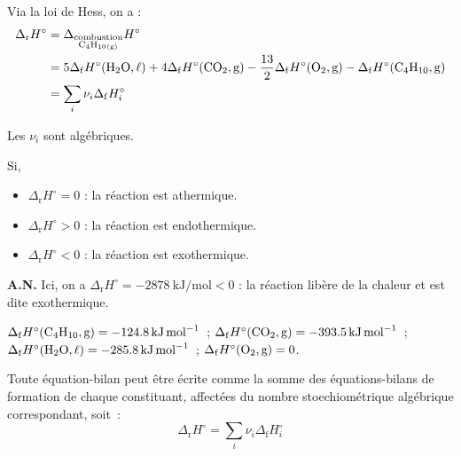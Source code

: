 \documentclass{article}
\newcommand{\Dr}{\Delta_{\mathrm{r}}}
\newcommand{\Df}{\Delta_{\mathrm{f}}}
\begin{document}
\begin{tableau}
    Via la loi de Hess, on a :
    \begin{align*}
        \Dr H^\circ &= \Delta_{\substack{\mathrm{combustion}\\\ce{C4H10_{(g)}}}} H^\circ\\
        &= 5\Df H^\circ(\ce{H2O,\ell}) + 4\Df H^\circ (\ce{CO2,g}) - \frac{13}{2} \Df H^\circ(\ce{O2,g})-\Df H^\circ (\ce{C4H10,g)}\\
        & = \sum_i \nu_i \Df H_i^\circ
    \end{align*}
    \begin{attention}
        Les $\nu_i$ sont algébriques.
    \end{attention}
    Si,
    \begin{itemize}
        \item $\Dr H^\circ =0$ : la réaction est athermique.
        \item $\Dr H^\circ >0$ : la réaction est endothermique.
        \item $\Dr H^\circ <0$ : la réaction est exothermique.
    \end{itemize}
    \begin{appnum}
        \textbf{A.N.} Ici, on a $\Dr H^\circ = \SI{-2878}{\kilo\joule\per\mole} <0$ : la réaction libère de la chaleur et est dite exothermique.
    \end{appnum}
\end{tableau}
\begin{remarque}[{Données à $T_0 = \SI{298}{K} $}]
    $\Df H^\circ(\ce{C4H10,g}) = \SI{-124,8}{\kilo\joule\per\mole}$~; $\Df H^\circ (\ce{CO2,g}) = \SI{-393,5}{\kilo\joule\per\mole}$~;  $\Df H^\circ(\ce{H2O,\ell}) = \SI{-285,8}{\kilo\joule\per\mole}$~; $\Df H^\circ(\ce{O2, g}) = 0$.
    \end{remarque}
\begin{enonce}
Toute équation-bilan peut être écrite comme la somme des équations-bilans de formation de chaque constituant, affectées du nombre stoechiométrique algébrique correspondant, soit~:
$$\Dr H^\circ=\sum_i\nu_i\Df H_i^\circ$$
\end{enonce}

\end{document}
